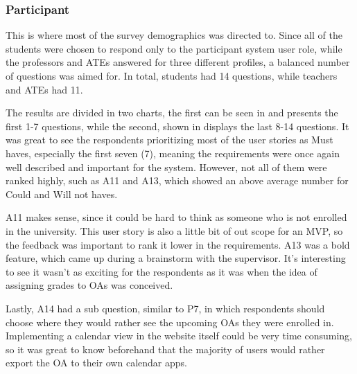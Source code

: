 \subsubsection{Participant}\label{sec:survey-quant-participant}

This is where most of the survey demographics was directed to. Since all of the students were chosen to respond only to the participant system user role, while the professors and \acp{ATE} answered for three different profiles, a balanced number of questions was aimed for. In total, students had 14 questions, while teachers and \acp{ATE} had 11.

The results are divided in two charts, the first can be seen in  and presents the first 1-7 questions, while the second, shown in  displays the last 8-14 questions. It was great to see the respondents prioritizing most of the user stories as Must haves, especially the first seven (7), meaning the requirements were once again well described and important for the system. However, not all of them were ranked highly, such as A11 and A13, which showed an above average number for Could and Will not haves.

A11 makes sense, since it could be hard to think as someone who is not enrolled in the university. This user story is also a little bit of out scope for an \ac{MVP}, so the feedback was important to rank it lower in the requirements. A13 was a bold feature, which came up during a brainstorm with the supervisor. It's interesting to see it wasn't as exciting for the respondents as it was when the idea of assigning grades to \acp{OA} was conceived.

Lastly, A14 had a sub question, similar to P7, in which respondents should choose where they would rather see the upcoming \acp{OA} they were enrolled in. Implementing a calendar view in the website itself could be very time consuming, so it was great to know beforehand that the majority of users would rather export the \ac{OA} to their own calendar apps.

